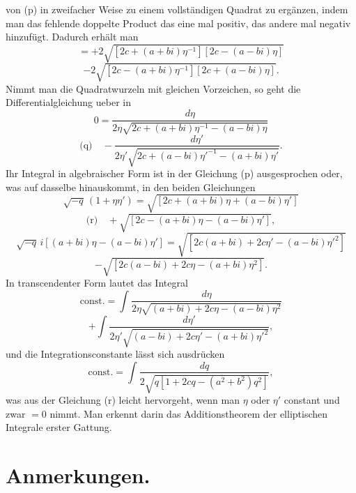 \documentclass[12pt,a4paper]{article}
\begin{document}
\newpage
\noindent von (p) in zweifacher Weise zu einem vollst\"andigen Quadrat zu erg\"anzen, indem man das fehlende doppelte Product das eine mal positiv, das andere mal negativ hinzuf\"ugt. Dadurch erh\"alt man
\[= +2\sqrt{[2c + (a+bi)\eta^{-1}][2c - (a-bi)\eta]}\]
\[-2\sqrt{[2c - (a+bi)\eta^{-1}][2c + (a-bi)\eta]}.\]
Nimmt man die Quadratwurzeln mit gleichen Vorzeichen, so geht die Differentialgleichung ueber in
\[0 = \frac{d\eta}{2\eta\sqrt{2c + (a+bi)\eta^{-1} - (a-bi)\eta}}\]
\[\text{(q)} \quad - \frac{d\eta'}{2\eta'\sqrt{2c + (a-bi)\eta'^{-1} - (a+bi)\eta'}}.\]
Ihr Integral in algebraischer Form ist in der Gleichung (p) ausgesprochen oder, was auf dasselbe hinauskommt, in den beiden Gleichungen
\[\sqrt{-q}\, (1 + \eta\eta') = \sqrt{[2c + (a+bi)\eta + (a-bi)\eta']}\]
\[\text{(r)} \quad + \sqrt{[2c - (a+bi)\eta - (a-bi)\eta']},\]
\[\sqrt{-q}\, i[(a+bi)\eta - (a-bi)\eta'] = \sqrt{[2c(a+bi) + 2c\eta' - (a-bi)\eta'^{2}]}\]
\[- \sqrt{[2c(a-bi) + 2c\eta - (a+bi)\eta^{2}]}.\]
In transcendenter Form lautet das Integral
\[\text{const.} = \int \frac{d\eta}{2\eta\sqrt{(a+bi) + 2c\eta - (a-bi)\eta^{2}}}\]
\[+ \int \frac{d\eta'}{2\eta'\sqrt{(a-bi) + 2c\eta' - (a+bi)\eta'^{2}}},\]
und die Integrationsconstante l\"asst sich ausdr\"ucken
\[\text{const.} = \int \frac{dq}{2\sqrt{q[1 + 2cq - (a^{2} + b^{2})q^{2}]}},\]
was aus der Gleichung (r) leicht hervorgeht, wenn man $\eta$ oder $\eta'$ constant und zwar $= 0$ nimmt. Man erkennt darin das Additionstheorem der elliptischen Integrale erster Gattung.

\newpage
\section*{Anmerkungen.}
\end{document}

